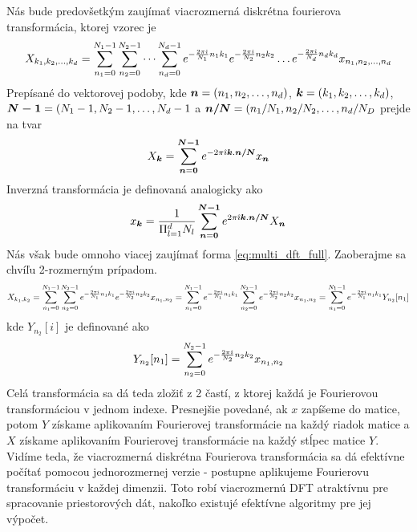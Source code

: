 Nás bude predovšetkým zaujímať viacrozmerná diskrétna fourierova
transformácia, ktorej vzorec je
\begin{equation}
    X_{k_1,k_2,\dots,k_d} = \sum_{n_1=0}^{N_1-1}
        \sum_{n_2=0}^{N_2-1} \dots \sum_{n_d=0}^{N_d-1}
        e^{-\frac{2\pi\hat{\imath}}{N_1} n_1 k_1}
        e^{-\frac{2\pi\hat{\imath}}{N_2} n_2 k_2} \dots
        e^{-\frac{2\pi\hat{\imath}}{N_d} n_d k_d}
        x_{n_1,n_2,\dots,n_d}
    \label{eq:multi_dft_full}
\end{equation}
Prepísané do vektorovej podoby, kde $\boldsymbol{n}=(n_1,n_2,\dots,n_d)$,
$\boldsymbol{k}=(k_1,k_2,\dots,k_d)$,
$\boldsymbol{N-1}=(N_1-1,N_2-1,\dots,N_d-1$ a $\boldsymbol{n/N}=(n_1/N_1,
n_2/N_2, \dots, n_d/N_D$ prejde na tvar
\begin{equation}
    X_{\boldsymbol{k}} = \sum_{\boldsymbol{n}=\boldsymbol{0}}^{\boldsymbol{N-1}}
      e^{-2\pi\hat{\imath} \boldsymbol{k}.\boldsymbol{n/N}} x_{\boldsymbol{n}}
\end{equation}
Inverzná transformácia je definovaná analogicky ako
\begin{equation}
    x_{\boldsymbol{k}} = \frac{1}{\Pi_{l=1}^{d} N_l} 
            \sum_{\boldsymbol{n}=\boldsymbol{0}}^{\boldsymbol{N-1}}
                e^{2\pi\hat{\imath} \boldsymbol{k}.\boldsymbol{n/N}} X_{\boldsymbol{n}}
\end{equation}
Nás však bude omnoho viacej zaujímať forma \ref{eq:multi_dft_full}.
Zaoberajme sa chvíľu 2-rozmerným prípadom.
\begin{equation}
    X_{k_1,k_2} =
        \sum_{n_1=0}^{N_1-1}
        \sum_{n_2=0}^{N_2-1} 
        e^{-\frac{2\pi\hat{\imath}}{N_1} n_1 k_1}
        e^{-\frac{2\pi\hat{\imath}}{N_2} n_2 k_2} 
        x_{n_1,n_2} =
        \sum_{n_1=0}^{N_1-1}
        e^{-\frac{2\pi\hat{\imath}}{N_1} n_1 k_1}
        \sum_{n_2=0}^{N_2-1} 
        e^{-\frac{2\pi\hat{\imath}}{N_2} n_2 k_2} 
        x_{n_1,n_2} =
        \sum_{n_1=0}^{N_1-1}
        e^{-\frac{2\pi\hat{\imath}}{N_1} n_1 k_1}
          Y_{n_2}[n_1]
\end{equation}
kde $Y_{n_2}[i]$ je definované ako
\begin{equation}
    Y_{n_2}[n_1]=
        \sum_{n_2=0}^{N_2-1} e^{-\frac{2\pi\hat{\imath}}{N_2} n_2 k_2} x_{n_1,n_2}
\end{equation}
Celá transformácia sa dá teda zložiť z 2 častí, z ktorej každá je
Fourierovou transformáciou v jednom indexe. Presnejšie povedané, ak
$x$ zapíšeme do matice, potom $Y$ získame aplikovaním Fourierovej
transformácie na každý riadok matice a $X$ získame aplikovaním
Fourierovej transformácie na každý stĺpec matice $Y$.
Vidíme teda, že viacrozmerná diskrétna Fourierova transformácia sa dá
efektívne počítať pomocou jednorozmernej verzie - postupne aplikujeme
Fourierovu transformáciu v každej dimenzii. Toto robí viacrozmernú DFT
atraktívnu pre spracovanie priestorových dát, nakoľko existujé
efektívne algoritmy pre jej výpočet.

